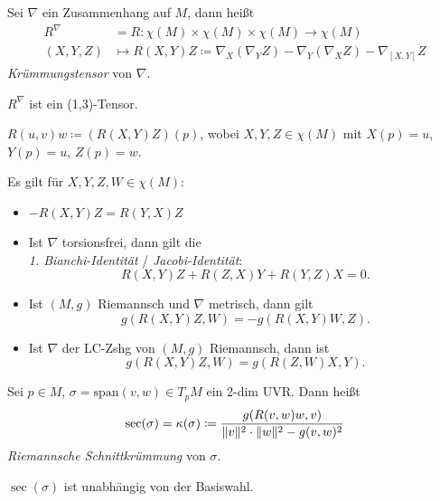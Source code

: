 \documentclass{cheat-sheet}
\newcommand{\Span}{\mathrm{span}} %
\begin{document}

\begin{defn}
  Sei $\nabla$ ein Zusammenhang auf $M$, dann heißt
  \begin{align*}
    R^{\nabla} & = R : \chi(M) \times \chi(M) \times \chi(M) \to \chi(M) \\
    (X, Y, Z) & \mapsto R(X, Y)Z \coloneqq \nabla_X (\nabla_Y Z) - \nabla_Y (\nabla_X Z) - \nabla_{[X, Y]} Z
  \end{align*}
  \emph{Krümmungstensor} von $\nabla$.
\end{defn}

\begin{bem}
  $R^\nabla$ ist ein (1,3)-Tensor.
\end{bem}

\begin{nota}
  $R(u, v)w \coloneqq (R(X, Y)Z)(p)$, wobei $X, Y, Z \in \chi(M)$ mit $X(p) = u$, $Y(p) = u$, $Z(p) = w$.
\end{nota}

\begin{satz}
  Es gilt für $X,Y,Z,W \in \chi(M)$:
  \begin{itemize}
    \item $- R(X, Y)Z = R(Y, X)Z$
    \item Ist $\nabla$ torsionsfrei, dann gilt die \\
    \emph{1. Bianchi-Identität} / \emph{Jacobi-Identität}:
    \[ R(X,Y)Z + R(Z,X)Y + R(Y,Z)X = 0. \]
    \item Ist $(M, g)$ Riemannsch und $\nabla$ metrisch, dann gilt
    \[ g(R(X,Y)Z, W) = -g(R(X,Y)W, Z). \]
    \item Ist $\nabla$ der LC-Zshg von $(M, g)$ Riemannsch, dann ist
    \[ g(R(X, Y)Z, W) = g(R(Z,W)X,Y). \]
  \end{itemize}
\end{satz}


\begin{defn}
  Sei $p \in M$, $\sigma = \Span(v,w) \in T_p M$ ein 2-dim UVR. Dann heißt
  \[ \sec(\sigma) = \kappa(\sigma) \coloneqq \frac{g(R(v,w)w,v)}{\lVert v\rVert^2 \cdot \lVert w\rVert^2 - g(v,w)^2} \]
  \emph{Riemannsche Schnittkrümmung} von $\sigma$.
\end{defn}

\begin{lem}
  $\sec(\sigma)$ ist unabhängig von der Basiswahl.
\end{lem}
\end{document}
